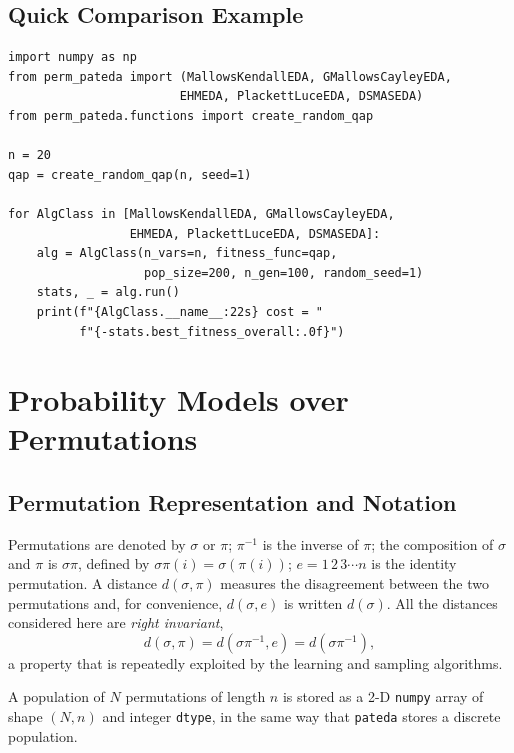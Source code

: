 \documentclass[a4paper,11pt]{article}
\begin{document}
\subsection{Quick Comparison Example}

\begin{lstlisting}
import numpy as np
from perm_pateda import (MallowsKendallEDA, GMallowsCayleyEDA,
                        EHMEDA, PlackettLuceEDA, DSMASEDA)
from perm_pateda.functions import create_random_qap

n = 20
qap = create_random_qap(n, seed=1)

for AlgClass in [MallowsKendallEDA, GMallowsCayleyEDA,
                 EHMEDA, PlackettLuceEDA, DSMASEDA]:
    alg = AlgClass(n_vars=n, fitness_func=qap,
                   pop_size=200, n_gen=100, random_seed=1)
    stats, _ = alg.run()
    print(f"{AlgClass.__name__:22s} cost = "
          f"{-stats.best_fitness_overall:.0f}")
\end{lstlisting}

\section{Probability Models over Permutations}
\label{sec:models}

\subsection{Permutation Representation and Notation}

Permutations are denoted by $\sigma$ or $\pi$; $\pi^{-1}$ is the inverse of
$\pi$; the composition of $\sigma$ and $\pi$ is $\sigma\pi$, defined by
$\sigma\pi(i) = \sigma(\pi(i))$; $e = 1\,2\,3\cdots n$ is the identity
permutation.  A distance $d(\sigma,\pi)$ measures the disagreement between the
two permutations and, for convenience, $d(\sigma,e)$ is written $d(\sigma)$.  All
the distances considered here are \emph{right invariant},
\begin{equation}
d(\sigma, \pi) = d(\sigma\pi^{-1}, e) = d(\sigma\pi^{-1}) ,
\end{equation}
a property that is repeatedly exploited by the learning and sampling algorithms.

A population of $N$ permutations of length $n$ is stored as a 2-D
\texttt{numpy} array of shape $(N, n)$ and integer \texttt{dtype}, in the same
way that \texttt{pateda} stores a discrete population.
\end{document}
